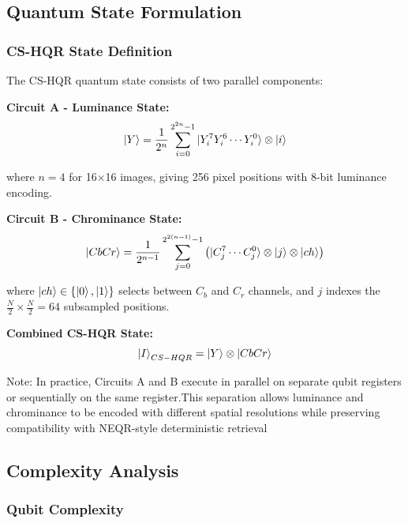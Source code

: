 \documentclass[11pt,a4paper]{article}
\begin{document}
\subsection{Quantum State Formulation}

\subsubsection{CS-HQR State Definition}

The CS-HQR quantum state consists of two parallel components:

\textbf{Circuit A - Luminance State:}
\begin{equation}
\ket{Y} = \frac{1}{2^n} \sum_{i=0}^{2^{2n}-1} \ket{Y_i^7 Y_i^6 \cdots Y_i^0} \otimes \ket{i}
\label{eq:luma_state}
\end{equation}

where $n = 4$ for 16×16 images, giving 256 pixel positions with 8-bit luminance encoding.

\textbf{Circuit B - Chrominance State:}
\begin{equation}
\ket{CbCr} = \frac{1}{2^{n-1}} \sum_{j=0}^{2^{2(n-1)}-1} \left( \ket{C_j^7 \cdots C_j^0} \otimes \ket{j} \otimes \ket{ch} \right)
\label{eq:chroma_state}
\end{equation}

where $\ket{ch} \in \{\ket{0}, \ket{1}\}$ selects between $C_b$ and $C_r$ channels, and $j$ indexes the $\frac{N}{2} \times \frac{N}{2} = 64$ subsampled positions.

\textbf{Combined CS-HQR State:}
\begin{equation}
\ket{I}_{CS-HQR} = \ket{Y} \otimes \ket{CbCr}
\label{eq:cshqr_combined}
\end{equation}

Note: In practice, Circuits A and B execute in parallel on separate qubit registers or sequentially on the same register.This separation allows luminance and chrominance to be encoded with different spatial resolutions while preserving compatibility with NEQR-style deterministic retrieval

\subsection{Complexity Analysis}

\subsubsection{Qubit Complexity}
\end{document}
